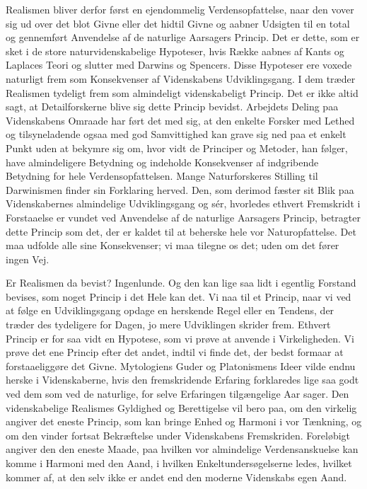 \documentclass[12pt,a4paper]{article}
\newcommand{\opage}[1]{\marginnote{\footnotesize\textit{[#1]}}}
\begin{document}
Realismen bliver derfor først en ejendommelig Verdensopfattelse, naar
den vover sig ud over det blot Givne eller det hidtil Givne og aabner
Udsigten til en total og gennemført Anvendelse af de naturlige Aarsagers
Princip. Det er dette, som er sket i de store naturvidenskabelige
Hypoteser, hvis Række aabnes af Kants og Laplaces Teori og slutter med
Darwins og Spencers. Disse Hypoteser ere voxede naturligt frem som
Konsekvenser af Videnskabens Udviklingsgang. I dem træder Realismen
tydeligt frem som almindeligt videnskabeligt Princip. Det er ikke altid
sagt, at Detailforskerne blive sig dette Princip bevidst. Arbejdets
Deling paa Videnskabens Omraade har ført det med sig, at den enkelte
Forsker med Lethed og tilsyneladende ogsaa med god Samvittighed kan
grave sig ned paa et enkelt Punkt uden at bekymre sig om, hvor vidt de
Principer og Metoder, han følger, have almindeligere Betydning og
indeholde Konsekvenser af indgribende Betydning for hele
Verdensopfattelsen. Mange Naturforskeres Stilling til Darwinismen finder
sin Forklaring herved. Den, som derimod fæster sit Blik paa
Videnskabernes almindelige Udviklingsgang og sér, hvorledes ethvert
Fremskridt i Forstaaelse er vundet ved Anvendelse af de naturlige
Aarsagers Princip, betragter dette Princip som det, der er kaldet til at
beherske hele vor Naturopfattelse. Det maa udfolde alle sine Konsekvenser;
vi maa tilegne os det; uden om det fører ingen Vej.

Er Realismen da bevist? Ingenlunde. Og den kan lige saa lidt i egentlig
Forstand bevises, som noget Princip i det Hele kan det. Vi naa til et
Princip, naar vi ved at følge en Udviklingsgang opdage en herskende
Regel eller en Tendens, der træder des tydeligere for Dagen, jo mere
Udviklingen skrider frem. Ethvert Princip er for saa vidt en Hypotese,
som vi prøve at anvende i Virkeligheden. Vi prøve det ene Princip efter
det andet, indtil vi finde det, der bedst formaar at forstaaeliggøre
det Givne. Mytologiens Guder og Platonismens Ideer vilde endnu herske i
Videnskaberne, hvis den fremskridende Erfaring forklaredes lige saa godt
ved dem som ved de naturlige, for selve Erfaringen tilgængelige Aar%
\opage{7}sager.
Den videnskabelige Realismes Gyldighed og Berettigelse vil bero paa, om
den virkelig angiver det eneste Princip, som kan bringe Enhed og Harmoni
i vor Tænkning, og om den vinder fortsat Bekræftelse under Videnskabens
Fremskriden. Foreløbigt angiver den den eneste Maade, paa hvilken vor
almindelige Verdensanskuelse kan komme i Harmoni med den Aand, i hvilken
Enkeltundersøgelserne ledes, hvilket kommer af, at den selv ikke er
andet end den moderne Videnskabs egen Aand.
\end{document}
